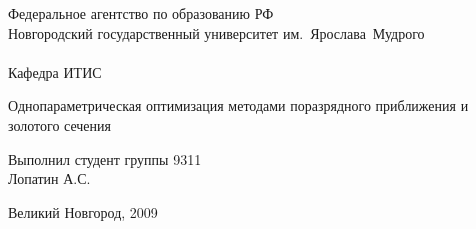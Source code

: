 \begin{titlepage}
\begin{center}

\fontsize{14pt}{18pt}
\selectfont

\vfill
Федеральное агентство по образованию РФ\\
Новгородский государственный университет им.~Ярослава~Мудрого\\
\hrulefill\\
Кафедра ИТИС

\vfill
\vfill

{
\huge
Однопараметрическая оптимизация\linebreak
методами поразрядного приближения и\linebreak
золотого сечения
}

\vfill

{
\begin{flushright}
Выполнил студент группы 9311\\
Лопатин А.С.
\end{flushright}
}

\vfill

Великий Новгород, 2009
\end{center}
\end{titlepage}
